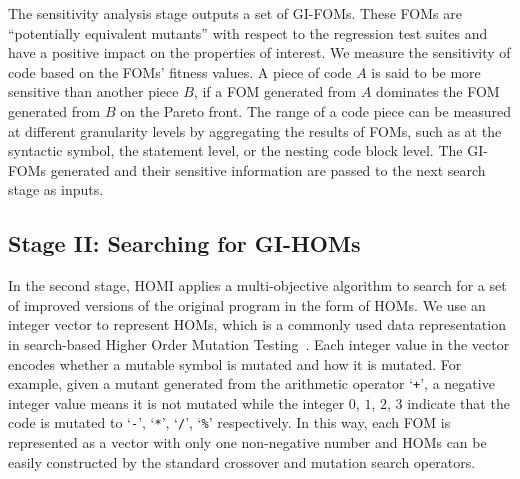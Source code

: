 \documentclass[oribibl]{llncs}
\begin{document}

The sensitivity analysis stage outputs a set of GI-FOMs. These FOMs are ``potentially equivalent mutants'' with respect to the regression test suites and have a positive impact on the properties of interest.  We measure the sensitivity of code based on the FOMs' fitness values.  A piece of code $A$ is said to be more sensitive than another piece $B$, if a FOM generated from $A$ dominates the FOM generated from $B$ on the Pareto front. The range of a code piece can be measured at different granularity levels by aggregating the results of FOMs, such as at the syntactic symbol, the statement level, or the nesting code block level. The GI-FOMs generated and their sensitive information are passed to the next search stage as inputs.





\subsection{Stage II: Searching for GI-HOMs}
\label{sec_hom}

In the second stage, HOMI applies a multi-objective algorithm to search for a set of improved versions of the original program in the form of HOMs. We use an integer vector to represent HOMs, which is a commonly used data representation in search-based Higher Order Mutation Testing~\cite{Jia20091379}. Each integer value in the vector encodes whether a mutable symbol is mutated and how it is mutated. For example, given a mutant generated from the arithmetic operator `\texttt{+}',  a negative integer value means it is not mutated while the integer $0$, $1$, $2$, $3$ indicate that the code is mutated to `\texttt{-}', `\texttt{*}', `\texttt{/}', `\texttt{\%}' respectively.  In this way, each FOM is represented as a vector with only one non-negative number and HOMs can be easily constructed by the standard crossover and mutation search operators. 
\end{document}
